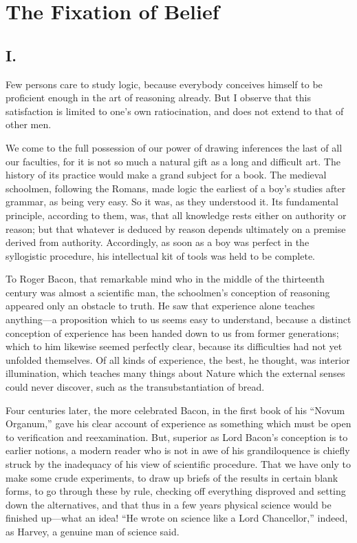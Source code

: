 
\author{Charles Sanders Peirce}
\chapter[Charles Sanders Peirce -- The Fixation of Belief]{The
Fixation of Belief}



\section*{I.}

Few persons care to study logic, because everybody conceives himself
to be proficient enough in the art of reasoning already. But I observe
that this satisfaction is limited to one's own ratiocination, and does
not extend to that of other men.

We come to the full possession of our power of drawing inferences the
last of all our faculties, for it is not so much a natural gift as a
long and difficult art. The history of its practice would make a grand
subject for a book. The medieval schoolmen, following the Romans, made
logic the earliest of a boy's studies after grammar, as being very
easy. So it was, as they understood it. Its fundamental principle,
according to them, was, that all knowledge rests either on authority
or reason; but that whatever is deduced by reason depends ultimately
on a premise derived from authority. Accordingly, as soon as a boy
was perfect in the syllogistic procedure, his intellectual kit of
tools was held to be complete.

To Roger Bacon, that remarkable mind who in the middle of the
thirteenth century was almost a scientific man, the schoolmen's
conception of reasoning appeared only an obstacle to truth. He saw
that experience alone teaches anything---a proposition which to us
seems easy to understand, because a distinct conception of experience
has been handed down to us from former generations; which to him
likewise seemed perfectly clear, because its difficulties had not yet
unfolded themselves. Of all kinds of experience, the best, he thought,
was interior illumination, which teaches many things about Nature
 which the external senses could never discover, such as the
transubstantiation of bread.

Four centuries later, the more celebrated Bacon, in the first book of
his ``Novum Organum,'' gave his clear account of experience as
something which must be open to verification and reexamination. But,
superior as Lord Bacon's conception is to earlier notions, a modern
reader who is not in awe of his grandiloquence is chiefly struck by
the inadequacy of his view of scientific procedure. That we have only
to make some crude experiments, to draw up briefs of the results in
certain blank forms, to go through these by rule, checking off
everything disproved and setting down the alternatives, and that thus
in a few years physical science would be finished up---what an idea!
``He wrote on science like a Lord Chancellor,'' indeed, as Harvey, a
genuine man of science said.

